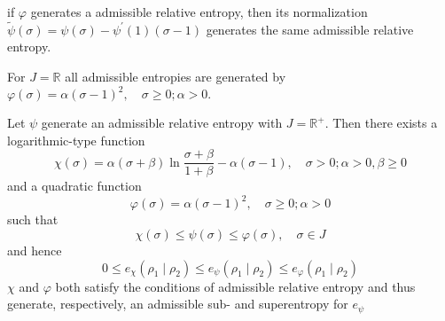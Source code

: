if \(\varphi\) generates a admissible relative entropy, then its normalization $\tilde{\psi}(\sigma)=\psi(\sigma)-\psi^{\prime}(1)(\sigma-1)$ generates the same admissible relative entropy.

\begin{lemma}\label{entropy_on_R}
	For $J=\mathbb{R}$ all admissible entropies are generated by $\varphi(\sigma)=\alpha(\sigma-1)^{2}, \quad \sigma \geq 0 ; \alpha>0 .$
\end{lemma}

\begin{lemma}
 Let $\psi$ generate an admissible relative entropy with $J=\mathbb{R}^{+} .$ Then there exists a logarithmic-type function 
 \begin{equation}\label{logarithmic-type-entropy-generator}
 \chi(\sigma)=\alpha(\sigma+\beta) \ln \frac{\sigma+\beta}{1+\beta}-\alpha(\sigma-1), \quad \sigma>0 ; \alpha>0, \beta \geq 0\end{equation}
  and a quadratic function
  \begin{equation}\varphi(\sigma)=\alpha(\sigma-1)^{2}, \quad \sigma \geq 0 ; \alpha>0\end{equation}
   such that
$$
\chi(\sigma) \leq \psi(\sigma) \leq \varphi(\sigma), \quad \sigma \in J
$$
and hence
$$
0 \leq e_{\chi}\left(\rho_{1} \mid \rho_{2}\right) \leq e_{\psi}\left(\rho_{1} \mid \rho_{2}\right) \leq e_{\varphi}\left(\rho_{1} \mid \rho_{2}\right)
$$
\(\chi\) and $\varphi$ both satisfy the conditions of admissible relative entropy and thus generate, respectively, an admissible sub- and superentropy for $e_{\psi}$	
\end{lemma}

